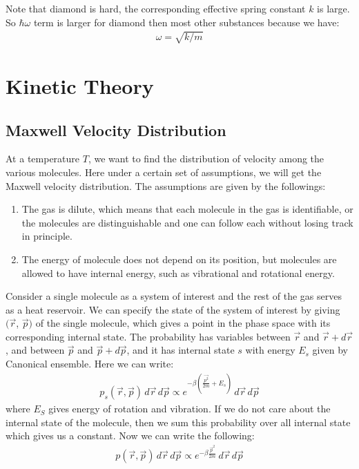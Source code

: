 \documentclass[11pt,oneside]{book}
\theoremstyle{break}
\theoremstyle{break}
\begin{document}
Note that diamond is hard, the corresponding effective spring constant $k$ is large. So $\hbar \omega$ term is larger for diamond then most other substances because we have:
\begin{align*}
\omega = \sqrt{k/m}
\end{align*}

\newpage
\chapter{Kinetic Theory}
\section[Maxwell Velocity Distribution]{\color{red}Maxwell Velocity Distribution\color{black}}
At a temperature $T$, we want to find the distribution of velocity among the various molecules. Here under a certain set of assumptions, we will get the Maxwell velocity distribution. The assumptions are given by the followings:
\begin{enumerate}
\item The gas is dilute, which means that each molecule in the gas is identifiable, or the molecules are distinguishable and one can follow each without losing track in principle. 
\item The energy of molecule does not depend on its position, but molecules are allowed to have internal energy, such as vibrational and rotational energy. 
\end{enumerate}
Consider a single molecule as a system of interest and the rest of the gas serves as a heat reservoir. We can specify the state of the system of interest by giving $(\vec{r}$, $\vec{p})$ of the single molecule, which gives a point in the phase space with its corresponding internal state. The probability has variables between $\vec{r}$ and $\vec{r}+d\vec{r}$, and between $\vec{p}$ and $\vec{p}+d\vec{p}$, and it has internal state $s$ with energy $E_s$ given by Canonical ensemble. Here we can write:
\begin{align*}
p_s(\vec{r},\vec{p})\, d\vec{r}\, d\vec{p} \propto e^{-\beta\left(\frac{\vec{p^2}}{2m}+E_s\right)}\, d\vec{r}\, d\vec{p}
\end{align*}
where $E_S$ gives energy of rotation and vibration. If we do not care about the internal state of the molecule, then we sum this probability over all internal state which gives us a constant. Now we can write the following:
\begin{align*}
p(\vec{r},\vec{p})\, d\vec{r}\,d\vec{p} \propto e^{-\beta \frac{\vec{p}^2}{2m}}\, d\vec{r}\, d\vec{p}
\end{align*}
\end{document}
